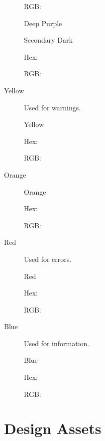 \documentclass[letterpaper,10pt,english]{sphinxmanual}
\begin{document}
\begin{description}
RGB: 

Deep Purple

Secondary Dark

Hex: 

RGB: 

\item[{Yellow}] \leavevmode
Used for warnings.


Yellow

Hex: 

RGB: 

\item[{Orange}] \leavevmode
{}

Orange

Hex: 

RGB: 

\item[{Red}] \leavevmode
Used for errors.


Red

Hex: 

RGB: 

\item[{Blue}] \leavevmode
Used for information.


Blue

Hex: 

RGB: 

\end{description}


\section{Design Assets}
\label{\detokenize{design/design_assets:design-assets}}\label{\detokenize{design/design_assets::doc}}
\end{document}
